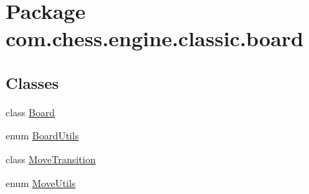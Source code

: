 \hypertarget{namespacecom_1_1chess_1_1engine_1_1classic_1_1board}{}\section{Package com.\+chess.\+engine.\+classic.\+board}
\label{namespacecom_1_1chess_1_1engine_1_1classic_1_1board}
\subsection*{Classes}
\begin{DoxyCompactItemize}
\item 
class \mbox{\hyperlink{classcom_1_1chess_1_1engine_1_1classic_1_1board_1_1_board}{Board}}
\item 
enum \mbox{\hyperlink{enumcom_1_1chess_1_1engine_1_1classic_1_1board_1_1_board_utils}{Board\+Utils}}
\item 
class \mbox{\hyperlink{classcom_1_1chess_1_1engine_1_1classic_1_1board_1_1_move_transition}{Move\+Transition}}
\item 
enum \mbox{\hyperlink{enumcom_1_1chess_1_1engine_1_1classic_1_1board_1_1_move_utils}{Move\+Utils}}
\end{DoxyCompactItemize}
